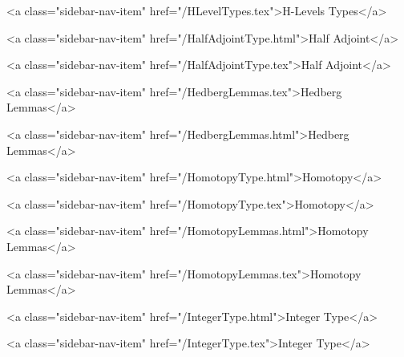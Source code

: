       
        
          <a class="sidebar-nav-item" href="/HLevelTypes.tex">H-Levels Types</a>
        
      
    
      
        
          <a class="sidebar-nav-item" href="/HalfAdjointType.html">Half Adjoint</a>
        
      
    
      
        
          <a class="sidebar-nav-item" href="/HalfAdjointType.tex">Half Adjoint</a>
        
      
    
      
        
          <a class="sidebar-nav-item" href="/HedbergLemmas.tex">Hedberg Lemmas</a>
        
      
    
      
        
          <a class="sidebar-nav-item" href="/HedbergLemmas.html">Hedberg Lemmas</a>
        
      
    
      
        
          <a class="sidebar-nav-item" href="/HomotopyType.html">Homotopy</a>
        
      
    
      
        
          <a class="sidebar-nav-item" href="/HomotopyType.tex">Homotopy</a>
        
      
    
      
        
          <a class="sidebar-nav-item" href="/HomotopyLemmas.html">Homotopy Lemmas</a>
        
      
    
      
        
          <a class="sidebar-nav-item" href="/HomotopyLemmas.tex">Homotopy Lemmas</a>
        
      
    
      
        
          <a class="sidebar-nav-item" href="/IntegerType.html">Integer Type</a>
        
      
    
      
        
          <a class="sidebar-nav-item" href="/IntegerType.tex">Integer Type</a>
        
      
    
